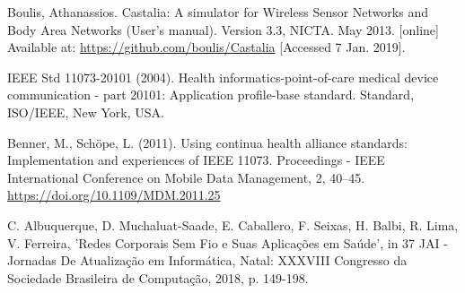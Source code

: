 \documentclass[conference]{IEEEtran}
\begin{document}
\begin{thebibliography}{00}
 Boulis, Athanassios. Castalia: A simulator for Wireless Sensor Networks and Body Area Networks (User's manual). Version 3.3, NICTA. May 2013. [online] Available at: \url{https://github.com/boulis/Castalia} [Accessed 7 Jan. 2019].

 IEEE Std 11073-20101 (2004). Health informatics-point-of-care medical
device communication - part 20101: Application profile-base standard. Standard, ISO/IEEE, New York, USA.

 Benner, M., Schöpe, L. (2011). Using continua health alliance standards: Implementation and experiences of IEEE 11073. Proceedings - IEEE International Conference on Mobile Data Management, 2, 40–45. \url{https://doi.org/10.1109/MDM.2011.25}

 C. Albuquerque, D. Muchaluat-Saade, E. Caballero, F. Seixas, H. Balbi, R. Lima, V. Ferreira, 'Redes Corporais Sem Fio e Suas Aplicações em Saúde', in 37 JAI - Jornadas De Atualização em Informática, Natal: XXXVIII Congresso da Sociedade Brasileira de Computação, 2018, p. 149-198.

\end{thebibliography}
\end{document}
